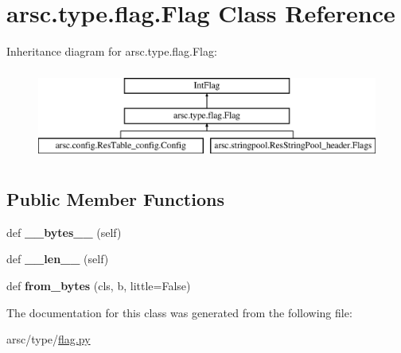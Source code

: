 \hypertarget{classarsc_1_1type_1_1flag_1_1Flag}{}\section{arsc.\+type.\+flag.\+Flag Class Reference}
\label{classarsc_1_1type_1_1flag_1_1Flag}
Inheritance diagram for arsc.\+type.\+flag.\+Flag\+:\begin{figure}[H]
\begin{center}
\leavevmode
\includegraphics[height=3.000000cm]{classarsc_1_1type_1_1flag_1_1Flag}
\end{center}
\end{figure}
\subsection*{Public Member Functions}
\begin{DoxyCompactItemize}
\item 
\mbox{\label{classarsc_1_1type_1_1flag_1_1Flag_a3b55dd3f42de1c244551d80b72776036}} 
def {\bfseries \+\_\+\+\_\+bytes\+\_\+\+\_\+} (self)
\item 
\mbox{\label{classarsc_1_1type_1_1flag_1_1Flag_a7d2f6513250191ea8042d6d07deed23e}} 
def {\bfseries \+\_\+\+\_\+len\+\_\+\+\_\+} (self)
\item 
\mbox{\label{classarsc_1_1type_1_1flag_1_1Flag_aadc826a24e4ca3e1b905d81d02865da9}} 
def {\bfseries from\+\_\+bytes} (cls, b, little=False)
\end{DoxyCompactItemize}


The documentation for this class was generated from the following file\+:\begin{DoxyCompactItemize}
\item 
arsc/type/\mbox{\hyperlink{flag_8py}{flag.\+py}}\end{DoxyCompactItemize}
